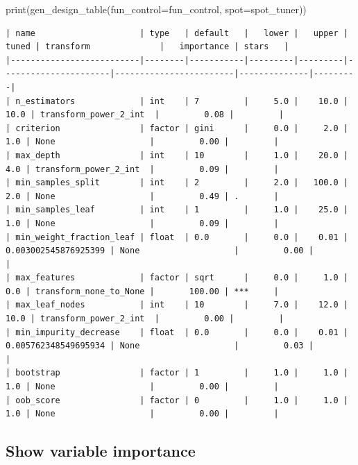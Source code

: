\documentclass[
  letterpaper,
  DIV=11,
  numbers=noendperiod]{scrreprt}
\newenvironment{Shaded}{\begin{snugshade}}{\end{snugshade}}
\newcommand{\BuiltInTok}[1]{\textcolor[rgb]{0.00,0.23,0.31}{#1}}
\newcommand{\NormalTok}[1]{\textcolor[rgb]{0.00,0.23,0.31}{#1}}
\newcommand{\OperatorTok}[1]{\textcolor[rgb]{0.37,0.37,0.37}{#1}}
\begin{document}
\begin{Shaded}
\begin{Highlighting}[]
\BuiltInTok{print}\NormalTok{(gen\_design\_table(fun\_control}\OperatorTok{=}\NormalTok{fun\_control,}
\NormalTok{    spot}\OperatorTok{=}\NormalTok{spot\_tuner))}
\end{Highlighting}
\end{Shaded}

\begin{verbatim}
| name                     | type   | default   |   lower |   upper |                tuned | transform              |   importance | stars   |
|--------------------------|--------|-----------|---------|---------|----------------------|------------------------|--------------|---------|
| n_estimators             | int    | 7         |     5.0 |    10.0 |                 10.0 | transform_power_2_int  |         0.08 |         |
| criterion                | factor | gini      |     0.0 |     2.0 |                  1.0 | None                   |         0.00 |         |
| max_depth                | int    | 10        |     1.0 |    20.0 |                  4.0 | transform_power_2_int  |         0.09 |         |
| min_samples_split        | int    | 2         |     2.0 |   100.0 |                  2.0 | None                   |         0.49 | .       |
| min_samples_leaf         | int    | 1         |     1.0 |    25.0 |                  1.0 | None                   |         0.09 |         |
| min_weight_fraction_leaf | float  | 0.0       |     0.0 |    0.01 | 0.003002545876925399 | None                   |         0.00 |         |
| max_features             | factor | sqrt      |     0.0 |     1.0 |                  0.0 | transform_none_to_None |       100.00 | ***     |
| max_leaf_nodes           | int    | 10        |     7.0 |    12.0 |                 10.0 | transform_power_2_int  |         0.00 |         |
| min_impurity_decrease    | float  | 0.0       |     0.0 |    0.01 | 0.005762348549695934 | None                   |         0.03 |         |
| bootstrap                | factor | 1         |     1.0 |     1.0 |                  1.0 | None                   |         0.00 |         |
| oob_score                | factor | 0         |     1.0 |     1.0 |                  1.0 | None                   |         0.00 |         |
\end{verbatim}

\hypertarget{show-variable-importance-1}{%
\subsection{Show variable importance}\label{show-variable-importance-1}}
\end{document}
